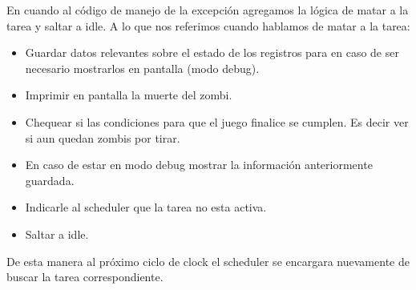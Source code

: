 	En cuando al código de manejo de la excepción agregamos la lógica de matar a la tarea y saltar a idle. A lo que nos referimos cuando hablamos de matar a la tarea:

	\begin{itemize}
		\item Guardar datos relevantes sobre el estado de los registros para en caso de ser necesario mostrarlos en pantalla (modo debug).

		\item Imprimir en pantalla la muerte del zombi.

		\item Chequear si las condiciones para que el juego finalice se cumplen. Es decir ver si aun quedan zombis por tirar.

		\item En caso de estar en modo debug mostrar la información anteriormente guardada.

		\item Indicarle al scheduler que la tarea no esta activa.

		\item Saltar a idle.
	\end{itemize} 

	De esta manera al próximo ciclo de clock el scheduler se encargara nuevamente de buscar la tarea correspondiente.